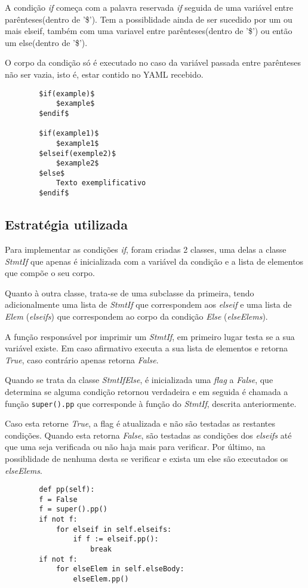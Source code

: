 \documentclass[../relatorio.tex]{subfiles}
\begin{document}
    A condição \textit{if} começa com a palavra reservada \textit{if}
    seguida de uma variável entre parênteses(dentro de '\$'). Tem a
    possiblidade ainda de ser sucedido por um ou mais elseif, também com 
    uma variavel entre parênteses(dentro de '\$') ou então um else(dentro de '\$').
    
    O corpo da condição só é executado no caso da variável passada entre parênteses
    não ser vazia, isto é, estar contido no YAML recebido.

    \begin{verbatim}
        $if(example)$
            $example$
        $endif$

        $if(example1)$
            $example1$
        $elseif(exemple2)$
            $example2$
        $else$
            Texto exemplificativo   
        $endif$
    \end{verbatim}

    \subsection*{Estratégia utilizada}

    Para implementar as condições \textit{if}, foram criadas 2 classes,
    uma delas a classe \textit{StmtIf} que apenas é inicializada com 
    a variável da condição e a lista de elementos que compõe o seu corpo.

    Quanto à outra classe, trata-se de uma subclasse da primeira, tendo 
    adicionalmente uma lista de \textit{StmtIf} que correspondem aos
    \textit{elseif} e uma lista de \textit{Elem} (\textit{elseifs}) que correspondem ao corpo
    da condição \textit{Else} (\textit{elseElems}). 

    A função responsável por imprimir um \textit{StmtIf}, em primeiro lugar testa se a sua 
    variável existe. Em caso afirmativo executa a sua lista de elementos e retorna \textit{True},
    caso contrário apenas retorna \textit{False}. 
    
    Quando se trata da classe \textit{StmtIfElse}, é inicializada uma \textit{flag} a \textit{False},
    que determina se alguma condição retornou verdadeira e em seguida é chamada a função 
    \texttt{super().pp} que corresponde à função do \textit{StmtIf}, descrita anteriormente.

    Caso esta retorne \textit{True}, a flag é atualizada e não são testadas as restantes condições. 
    Quando esta retorna \textit{False}, são testadas as condições dos \textit{elseifs} até que uma seja verificada ou não haja mais para verificar. 
    Por último, na possiblidade de nenhuma desta se verificar e exista um else
    são executados os \textit{elseElems}.
    \begin{verbatim}
        def pp(self):
        f = False
        f = super().pp()
        if not f:
            for elseif in self.elseifs:
                if f := elseif.pp():
                    break
        if not f:
            for elseElem in self.elseBody:
                elseElem.pp()
    \end{verbatim}    
\end{document}
